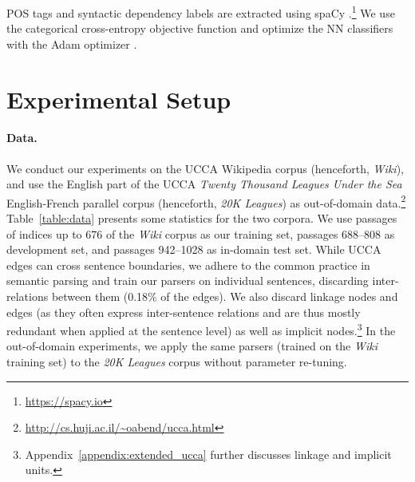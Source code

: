 \documentclass[11pt,a4paper]{article}
\newcommand{\tabref}[1]{Table~\ref{#1}}
\begin{document}
POS tags and syntactic dependency labels are extracted using spaCy
\cite{honnibal-johnson:2015:EMNLP}.\footnote{\url{https://spacy.io}}
We use the categorical cross-entropy objective function and optimize the
NN classifiers with the Adam optimizer \cite{kingma2014adam}.



\section{Experimental Setup}\label{sec:exp_setup}

\paragraph{Data.}
We conduct our experiments on the UCCA Wikipedia corpus (henceforth, \textit{Wiki}),
and use the English part of the UCCA \textit{Twenty Thousand Leagues Under the Sea}
English-French parallel corpus (henceforth, \textit{20K Leagues}) as
out-of-domain data.\footnote{\mbox{\url{http://cs.huji.ac.il/~oabend/ucca.html}}}
\tabref{table:data} presents some statistics for the two corpora.
We use passages of indices up to 676
of the \textit{Wiki} corpus as our training set, passages 688--808 as development set,
and passages 942--1028 as in-domain test set.
While UCCA edges can cross sentence boundaries, we adhere to the common
practice in semantic parsing and train our parsers on individual sentences,
discarding inter-relations between them (0.18\% of the edges).
We also discard linkage nodes and edges (as they often express inter-sentence
relations and are thus mostly redundant when applied at the sentence level)
as well as implicit nodes.\footnote{Appendix~\ref{appendix:extended_ucca}
further discusses linkage and implicit units.}
In the out-of-domain experiments, we apply the same parsers
(trained on the \textit{Wiki} training set) to the \textit{20K Leagues} corpus
without parameter re-tuning.
\end{document}

